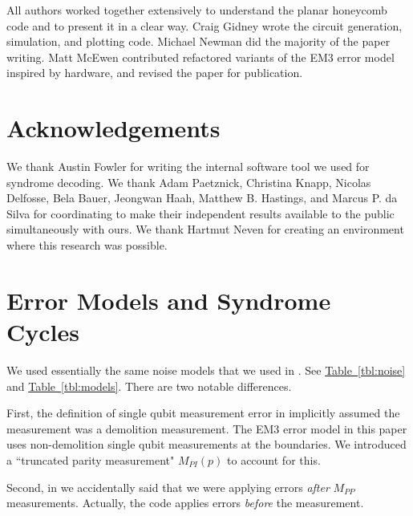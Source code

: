 \documentclass[onecolumn,unpublished,a4paper]{quantumarticle}
\theoremstyle{definition}
\theoremstyle{definition}
\theoremstyle{definition}
\newcommand{\tbl}[1]{\hyperref[tbl:#1]{Table~\ref*{tbl:#1}}}
\begin{document}
All authors worked together extensively to understand the planar honeycomb code and to present it in a clear way.
Craig Gidney wrote the circuit generation, simulation, and plotting code.
Michael Newman did the majority of the paper writing.
Matt McEwen contributed refactored variants of the EM3 error model inspired by hardware, and revised the paper for publication.

\section{Acknowledgements}

We thank Austin Fowler for writing the internal software tool we used for syndrome decoding.
We thank Adam Paetznick, Christina Knapp, Nicolas Delfosse, Bela Bauer, Jeongwan Haah, Matthew B. Hastings, and Marcus P. da Silva for coordinating to make their independent results available to the public simultaneously with ours.
We thank Hartmut Neven for creating an environment where this research was possible.




\appendix
\section{Error Models and Syndrome Cycles}
\label{app:noise}

We used essentially the same noise models that we used in \cite{gidney2021honeycombmemory}.
See \tbl{noise} and \tbl{models}.
There are two notable differences.

First, the definition of single qubit measurement error in \cite{gidney2021honeycombmemory} implicitly assumed the measurement was a demolition measurement.
The EM3 error model in this paper uses non-demolition single qubit measurements at the boundaries.
We introduced a ``truncated parity measurement" $M_{PI}(p)$ to account for this.

Second, in \cite{gidney2021honeycombmemory} we accidentally said that we were applying errors \emph{after} $M_{PP}$ measurements.
Actually, the code applies errors \emph{before} the measurement.
\end{document}
